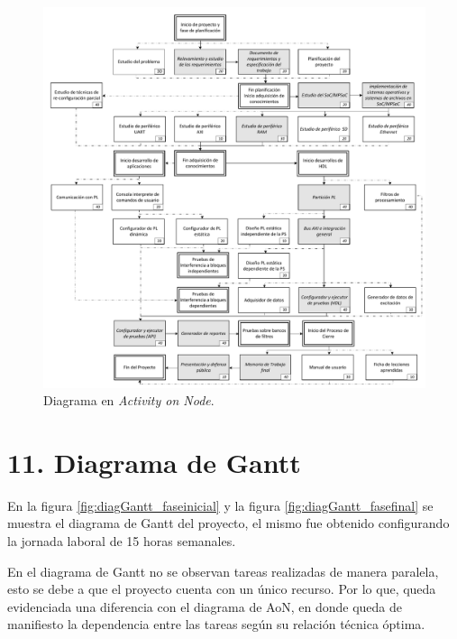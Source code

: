 \documentclass[
11pt, %
]{charter}
\begin{document}
\begin{figure}[hb]
\centering 
\includegraphics[width=1.05\textwidth]{./Figuras/AoN.pdf}
\caption{Diagrama en \textit{Activity on Node}.}
\label{fig:AoN}
\end{figure}

\clearpage

\section{11. Diagrama de Gantt}
\label{sec:gantt}

En la figura \ref{fig:diagGantt_faseinicial} y la figura \ref{fig:diagGantt_fasefinal} se muestra el diagrama de Gantt del proyecto, el mismo fue obtenido configurando la jornada laboral de 15 horas semanales.

En el diagrama de Gantt no se observan tareas realizadas de manera paralela,  esto se debe a que el proyecto cuenta con un único recurso. Por lo que, queda evidenciada una diferencia con el diagrama de AoN, en donde queda de manifiesto la dependencia entre las tareas según su relación técnica óptima.

\clearpage
\end{document}
